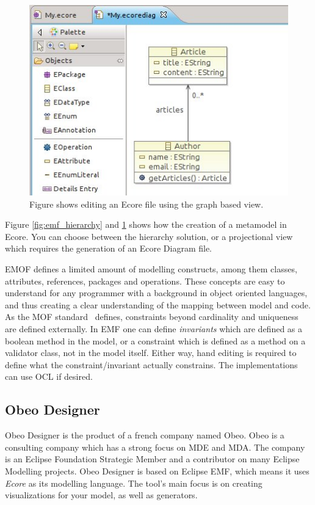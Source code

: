 \begin{figure}[htpb]
    \centering
    \centerline{\includegraphics[scale=0.8]{images/emf_diagram.jpeg}}
    \caption[Creating an Ecore file diagramatically]{Figure shows editing an Ecore file using the graph based view.}
    \label{fig:emf_diagram}
\end{figure}

Figure \ref{fig:emf_hierarchy} and \ref{fig:emf_diagram} shows how the creation of a metamodel in Ecore. You can choose between the hierarchy solution, or a projectional view which requires the generation of an Ecore Diagram file.

EMOF defines a limited amount of modelling constructs, among them classes, attributes, references, packages and operations. These concepts are easy to understand for any programmer with a background in object oriented languages, and thus creating a clear understanding of the mapping between model and code. As the MOF standard~\cite{OMG06MOF} defines, constraints beyond cardinality and uniqueness are defined externally. In EMF one can define \emph{invariants} which are defined as a boolean method in the model, or a constraint which is defined as a method on a validator class, not in the model itself. Either way, hand editing is required to define what the constraint/invariant actually constrains. The implementations can use OCL if desired.

\subsection{Obeo Designer}
Obeo Designer is the product of a french company named Obeo. Obeo is a consulting company which has a strong focus on MDE and MDA. The company is an Eclipse Foundation Strategic Member and a contributor on many Eclipse Modelling projects. Obeo Designer is based on Eclipse EMF, which means it uses \emph{Ecore} as its modelling language. The tool's main focus is on creating visualizations for your model, as well as generators. 

